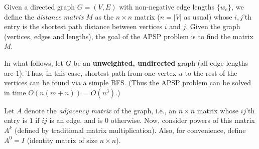 \documentclass[addpoints]{exam}
\def\mysolution#1{}    %
\begin{document}
\begin{questions}
Given a directed graph $G = (V, E)$ with non-negative edge lengths $\{w_e\}$, we define the {\em distance matrix} $M$ as the $n \times n$ matrix ($n = |V|$ as usual) whose $i,j$'th entry is the shortest path distance between vertices $i$ and $j$. Given the graph (vertices, edges and lengths), the goal of the APSP problem is to find the matrix $M$.

In what follows, let $G$ be an {\bf unweighted, undirected} graph (all edge lengths are $1$). Thus, in this case, shortest path from one vertex $u$ to the rest of the vertices can be found via a simple BFS. (Thus the APSP problem can be solved in time $O(n(m+n)) = O(n^3)$.)

Let $A$ denote the {\em adjacency matrix} of the graph, i.e., an $n \times n$ matrix whose $ij$'th entry is $1$ if $ij$ is an edge, and is $0$ otherwise.  Now, consider powers of this matrix $A^k$ (defined by traditional matrix multiplication).  Also, for convenience, define $A^0 = I$ (identity matrix of size $n\times n$). 


\mysolution{

}
\end{questions}
\end{document}
